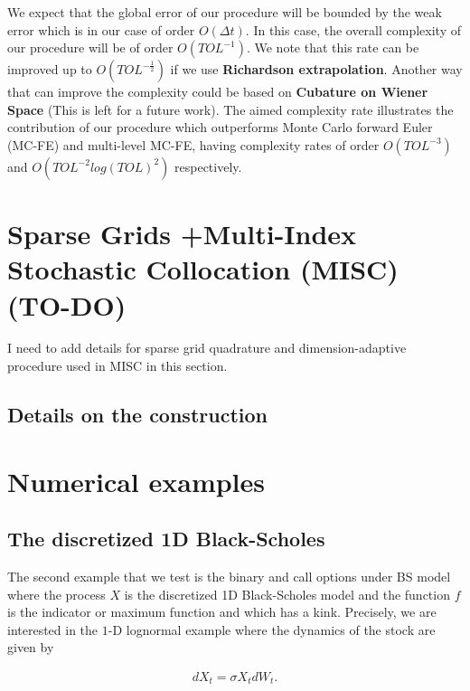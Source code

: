 \documentclass[11pt]{article}
\begin{document}
\begin{remark}
	We expect that the global error of our procedure will be bounded by the weak error which is in our case of order $O(\Delta t)$. In this case, the overall complexity of our procedure will be of order $O(TOL^{-1})$. We note that this rate can be improved up to $O(TOL^{-\frac{1}{2}})$ if we use \textbf{Richardson extrapolation}. Another way that can improve the complexity could be based on \textbf{Cubature on Wiener Space} (This is left for a future work). The aimed complexity rate illustrates the contribution of our procedure which outperforms  Monte Carlo forward Euler (MC-FE) and multi-level MC-FE, having complexity rates of order $O(TOL^{-3})$  and $O(TOL^{-2} log(TOL)^2)$  respectively. 
\end{remark}


\section{Sparse Grids +Multi-Index Stochastic Collocation (MISC) (TO-DO)}
I need to add details for sparse grid quadrature and dimension-adaptive procedure used in MISC in this section. 
\subsection{Details on the construction}




\newpage
\section{Numerical examples}





\subsection{The discretized 1D Black-Scholes}\label{sec:The discretized 1D Black-Scholes}

The second example that we test is the binary and  call options under BS model where the process $X$ is the discretized 1D Black-Scholes model and the function $f$ is the indicator or maximum function and which has a kink. Precisely, we are interested in the  $1$-D lognormal example where the dynamics of the stock are given by

\begin{align}\label{lognormal_dynamics}
	dX_t=\sigma X_t dW_t.
\end{align}
\end{document}
